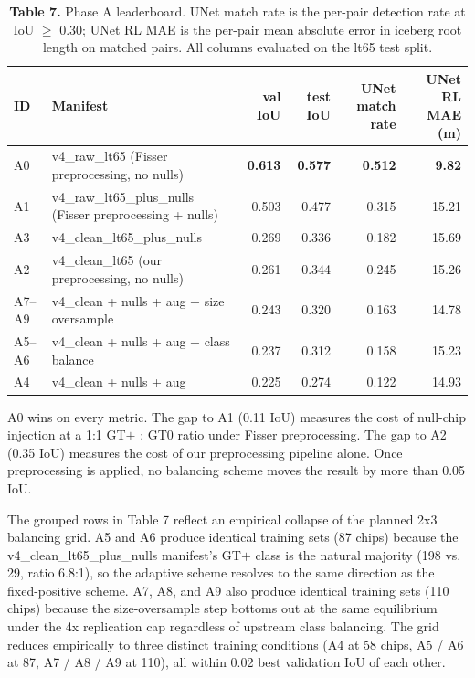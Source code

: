 \documentclass[review,jog]{igs}
\begin{document}
\begin{table}[h]
\caption{\textbf{Table 7.} Phase A leaderboard. UNet match rate is the per-pair detection rate at IoU $\geq$ 0.30; UNet RL MAE is the per-pair mean absolute error in iceberg root length on matched pairs. All columns evaluated on the lt65 test split.}
\centering
\begin{tabular}{llrrrr}
\toprule
ID & Manifest & val IoU & test IoU & UNet match rate & UNet RL MAE (m) \\
\midrule
A0 & v4\_raw\_lt65 (Fisser preprocessing, no nulls)            & \textbf{0.613} & \textbf{0.577} & \textbf{0.512} & \textbf{9.82} \\
A1 & v4\_raw\_lt65\_plus\_nulls (Fisser preprocessing + nulls) & 0.503 & 0.477 & 0.315 & 15.21 \\
A3 & v4\_clean\_lt65\_plus\_nulls                              & 0.269 & 0.336 & 0.182 & 15.69 \\
A2 & v4\_clean\_lt65 (our preprocessing, no nulls)             & 0.261 & 0.344 & 0.245 & 15.26 \\
A7--A9 & v4\_clean + nulls + aug + size oversample             & 0.243 & 0.320 & 0.163 & 14.78 \\
A5--A6 & v4\_clean + nulls + aug + class balance               & 0.237 & 0.312 & 0.158 & 15.23 \\
A4 & v4\_clean + nulls + aug                                   & 0.225 & 0.274 & 0.122 & 14.93 \\
\bottomrule
\end{tabular}
\end{table}

A0 wins on every metric. The gap to A1 (0.11 IoU) measures the cost of null-chip injection at a 1:1 GT$+$ : GT0 ratio under Fisser preprocessing. The gap to A2 (0.35 IoU) measures the cost of our preprocessing pipeline alone. Once preprocessing is applied, no balancing scheme moves the result by more than 0.05 IoU.

The grouped rows in Table 7 reflect an empirical collapse of the planned 2x3 balancing grid. A5 and A6 produce identical training sets (87 chips) because the v4\_clean\_lt65\_plus\_nulls manifest's GT$+$ class is the natural majority (198 vs. 29, ratio 6.8:1), so the adaptive scheme resolves to the same direction as the fixed-positive scheme. A7, A8, and A9 also produce identical training sets (110 chips) because the size-oversample step bottoms out at the same equilibrium under the 4x replication cap regardless of upstream class balancing. The grid reduces empirically to three distinct training conditions (A4 at 58 chips, A5 / A6 at 87, A7 / A8 / A9 at 110), all within 0.02 best validation IoU of each other.
\end{document}
